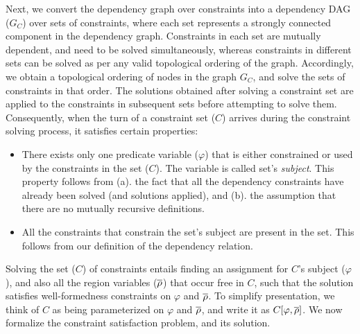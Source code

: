 Next, we convert the dependency graph over constraints into a
dependency DAG ($G_C$) over sets of constraints, where each set
represents a strongly connected component in the dependency graph.
Constraints in each set are mutually dependent, and need to be solved
simultaneously, whereas constraints in different sets can be solved as
per any valid topological ordering of the graph. Accordingly, we
obtain a topological ordering of nodes in the graph $G_{{C}}$, and
solve the sets of constraints in that order. The solutions obtained
after solving a constraint set are applied to the constraints in
subsequent sets before attempting to solve them. Consequently, when
the turn of a constraint set ($C$) arrives during the constraint solving
process, it satisfies certain properties:
\begin{itemize}
\item There exists only one predicate variable ($\varphi$) that is either
constrained or used by the constraints in the set ($C$). The variable is
called set's \emph{subject}. This property follows from (a). the fact
that all the dependency constraints have already been solved (and
solutions applied), and (b). the assumption that there are no mutually
recursive definitions. 
\item All the constraints that constrain the set's subject are present
in the set. This follows from our definition of the dependency relation.
\end{itemize}

Solving the set ($C$) of constraints entails finding an assignment for
$C$'s subject ($\varphi$), and also all the region variables
($\overline{\rho}$) that occur free in $C$, such that the solution satisfies
well-formedness constraints on $\varphi$ and $\overline{\rho}$. To simplify
presentation, we think of $C$ as being parameterized on
$\varphi$ and $\overline{\rho}$, and write it as $C\lbrack \varphi,\overline{\rho}
\rbrack$. We now formalize the constraint satisfaction problem, and
its solution.

